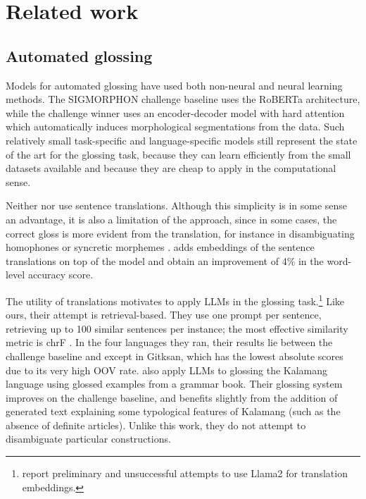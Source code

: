 \section{Related work}
\subsection{Automated glossing}


Models for automated glossing have used both non-neural \cite{palmer-etal-2009-evaluating,moeller-hulden-2018-automatic} and neural \cite{moeller-hulden-2018-automatic,zhao-etal-2020-automatic} learning methods. The SIGMORPHON challenge baseline \cite{ginn2023baseline} uses the RoBERTa architecture, while the challenge winner \cite{girrbach-2023-tu-cl} uses an encoder-decoder model with hard attention 
which automatically induces morphological segmentations from the data. Such relatively small task-specific and language-specific models still represent the state of the art for the glossing task, because they can learn efficiently from the small datasets available and because they are cheap to apply in the computational sense.

Neither \citet{ginn2023baseline} nor \citet{girrbach-2023-tu-cl} use sentence translations. Although this simplicity is in some sense an advantage, it is also a limitation of the approach, since in some cases, the correct gloss is more evident from the translation, for instance in disambiguating homophones or syncretic morphemes \cite{zhao-etal-2020-automatic}. \citet{yang2024embedded} adds embeddings of the sentence translations on top of the \citet{girrbach-2023-tu-cl} model and obtain an improvement of 4\% in the word-level accuracy score.


The utility of translations motivates \citet{ginn2024teachlanguagemodelsgloss} to apply LLMs in the glossing task.\footnote{\citet{yang2024embedded} report preliminary and unsuccessful attempts to use Llama2 for translation embeddings.} Like ours, their attempt is retrieval-based. They use one prompt per sentence, retrieving up to 100 similar sentences per instance; the most effective similarity metric is chrF \cite{popovic-2015-chrf}. In the four languages they ran, their results lie between the challenge baseline and \citet{girrbach-2023-tu-cl} except in Gitksan, which has the lowest absolute scores due to its very high OOV rate. \citet{aycock2024llmsreallylearntranslate} also apply LLMs to glossing the Kalamang language using glossed examples from a grammar book. Their glossing system improves on the challenge baseline, and benefits slightly from the addition of generated text explaining some typological features of Kalamang (such as the absence of definite articles). Unlike this work, they do not attempt to disambiguate particular constructions.

